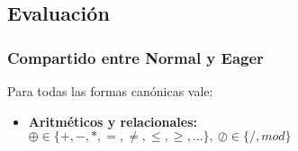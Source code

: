   \subsection{Evaluación}
    \subsubsection{Compartido entre Normal y Eager}
      \PN Para todas las formas canónicas vale: 
      \begin{itemize}
        \item \textbf{Aritméticos y relacionales:} $\oplus\in \{+,-,*,=,\neq,\leq,\geq,...\}, \ \oslash \in \{/, mod\}$
          \begin{itemize}
\end{itemize}
\end{itemize}
